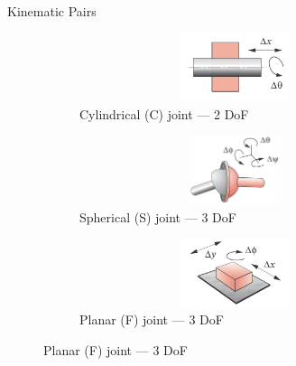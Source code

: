 \documentclass[aspectratio=169]{beamer}
\begin{document}
\begin{frame}[t]{Kinematic Pairs}
\begin{figure}[H]
        \begin{subfigure}{0.32\textwidth}
            \centering\includegraphics[height=2cm,width=1\textwidth,keepaspectratio]{C_joint.png}
            \caption{Cylindrical (C) joint --- 2 DoF}
            \label{fig:C_joint.png}
        \end{subfigure}
        \begin{subfigure}{0.32\textwidth}
            \centering\includegraphics[height=2cm,width=1\textwidth,keepaspectratio]{S_joint.png}
            \caption{Spherical (S) joint --- 3 DoF}
            \label{fig:S_joint.png}
        \end{subfigure}
        \begin{subfigure}{0.32\textwidth}
            \centering\includegraphics[height=2cm,width=1\textwidth,keepaspectratio]{F_joint.png}
            \caption{Planar (F) joint --- 3 DoF}
            \label{fig:F_joint.png}
        \end{subfigure}
    \end{figure}
\end{frame}
\end{document}
